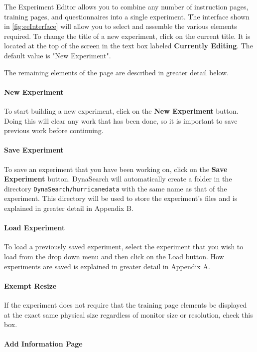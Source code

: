 \documentclass[article]{ij4uq}              %
\begin{document}
The Experiment Editor allows you to combine any number of instruction pages, training pages, and questionnaires into a single experiment. The interface shown in \ref{fig:eeInterface} will allow you to select and assemble the various elements required. To change the title of a new experiment, click on the current title. It is located at the top of the screen in the text box labeled \textbf{Currently Editing}.  The default value is "New Experiment".

The remaining elements of the page are described in greater detail below.

\paragraph{New Experiment}
To start building a new experiment, click on the \textbf{New Experiment} button. Doing this will clear any work that has been done, so it is important to save previous work before continuing.

\paragraph{Save Experiment}
To save an experiment that you have been working on, click on the \textbf{Save Experiment} button. DynaSearch will automatically create a folder in the directory \texttt{DynaSearch/hurricane\textunderscore data} with the same name as that of the experiment.  This directory will be used to store the experiment's files and is explained in greater detail in Appendix B.

\paragraph{Load Experiment}
To load a previously saved experiment, select the experiment that you wish to load from the drop down menu and then click on the Load button.  How experiments are saved is explained in greater detail in Appendix A.

\paragraph{Exempt Resize}
If the experiment does not require that the training page elements be displayed at the exact same physical size regardless of monitor size or resolution, check this box.

\paragraph{Add Information Page}
\end{document}

